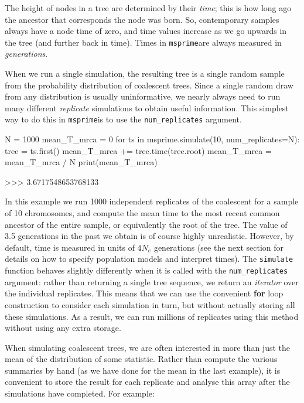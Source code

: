 \documentclass[graybox]{svmult}
\newcommand{\msprime}[0]{\texttt{msprime}}
\begin{document}
The height of nodes in a tree are determined by their \emph{time}; this
is how long ago the ancestor that corresponds the node was born. So,
contemporary samples always have a node time of zero, and time values
increase as we go upwards in the tree (and further back in time). Times
in \msprime are always measured in \emph{generations}.

When we run a single simulation, the resulting tree is a single random
sample from the probability distribution of coalescent trees. Since a
single random draw from any distribution is usually uninformative, we
nearly always need to run many different \emph{replicate} simulations to
obtain useful information. This simplest way to do this in \msprime is to
use the \texttt{num\_replicates} argument.

\begin{pythoncode}
N = 1000
mean_T_mrca = 0
for ts in msprime.simulate(10, num_replicates=N):
    tree = ts.first()
    mean_T_mrca += tree.time(tree.root)
mean_T_mrca = mean_T_mrca / N
print(mean_T_mrca)

>>> 3.6717548653768133
\end{pythoncode}

    In this example we run 1000 independent replicates of the coalescent for
a sample of 10 chromosomes, and compute the mean time to the most recent
common ancestor of the entire sample, or equivalently the root of the
tree. The value of 3.5 generations in the past we obtain is of course highly unrealistic. However, by default, time is measured in units of \(4 N_e\) generations (see the next section for details on how to
specify population models and interpret times). The
\texttt{simulate} function behaves slightly differently when it is
called with the \texttt{num\_replicates} argument: rather than returning
a single tree sequence, we return an \emph{iterator} over the individual
replicates. This means that we can use the
convenient \textbf{for} loop construction to consider each simulation in
turn, but without actually storing all these simulations. As a result,
we can run millions of replicates using this method without
using any extra storage.

When simulating coalescent trees, we are often interested in more than
just the mean of the distribution of some statistic. Rather than compute
the various summaries by hand (as we have done for the mean in the last
example), it is convenient to store the result for each
replicate and analyse this array after the simulations have completed.
For example:
\end{document}
